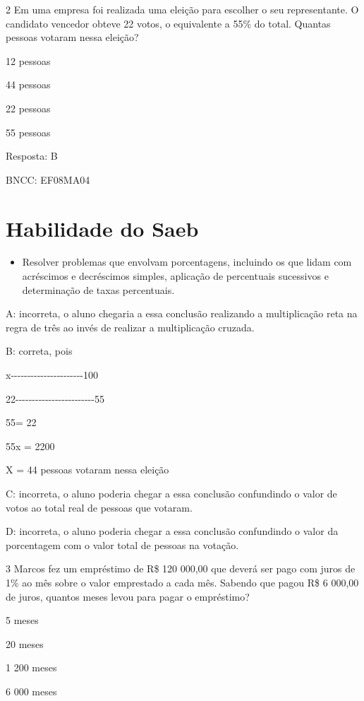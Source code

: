 \num{2} Em uma empresa foi realizada uma eleição para escolher o seu
representante. O candidato vencedor obteve 22 votos, o equivalente a
55\% do total. Quantas pessoas votaram nessa eleição?

\item 12 pessoas
\item 44 pessoas
\item 22 pessoas
\item 55 pessoas

Resposta: B

BNCC: EF08MA04

\section{Habilidade do Saeb}

\begin{itemize}
\tightlist

\item 
  Resolver problemas que envolvam porcentagens, incluindo os que lidam
  com acréscimos e decréscimos simples, aplicação de percentuais
  sucessivos e determinação de taxas percentuais.
\end{itemize}

A: incorreta, o aluno chegaria a essa conclusão realizando a
multiplicação reta na regra de três ao invés de realizar a multiplicação
cruzada.

B: correta, pois

x-\/-\/-\/-\/-\/-\/-\/-\/-\/-\/-\/-\/-\/-\/-\/-\/-\/-\/-\/-\/-\/-100

22-\/-\/-\/-\/-\/-\/-\/-\/-\/-\/-\/-\/-\/-\/-\/-\/-\/-\/-\/-\/-\/-\/-\/-55

55\times \times = 22

55x = 2200

X = 44 pessoas votaram nessa eleição

C: incorreta, o aluno poderia chegar a essa conclusão confundindo o
valor de votos ao total real de pessoas que votaram.

D: incorreta, o aluno poderia chegar a essa conclusão confundindo o
valor da porcentagem com o valor total de pessoas na votação.

\num{3} Marcos fez um empréstimo de R\$ 120 000,00 que deverá ser pago com
juros de 1\% ao mês sobre o valor emprestado a cada mês. Sabendo que
pagou R\$ 6 000,00 de juros, quantos meses levou para pagar o
empréstimo?

\item 5 meses
\item 20 meses
\item 1 200 meses
\item 6 000 meses


